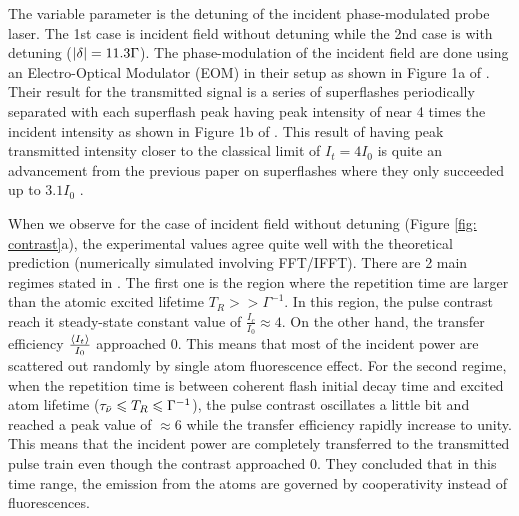 The variable parameter is the detuning of the incident phase-modulated probe laser. The 1st case is incident field without detuning while the 2nd case is with detuning ($\abs{\delta} = 11.3 \Gamma$). The phase-modulation of the incident field are done using an Electro-Optical Modulator (EOM) in their setup as shown in Figure 1a of \cite{Kwong2015}. Their result for the transmitted signal is a series of superflashes periodically separated with each superflash peak having peak intensity of near 4 times the incident intensity as shown in Figure 1b of \cite{Kwong2015}. This result of having peak transmitted intensity closer to the classical limit of $I_{t} = 4 I_{0}$ is quite an advancement from the previous paper on superflashes where they only succeeded up to $3.1 I_{0}$ \cite{Kwong2014}.

When we observe for the case of incident field without detuning (Figure \ref{fig: contrast}a), the experimental values agree quite well with the theoretical prediction \cite{Kwong2015} (numerically simulated involving FFT/IFFT). There are 2 main regimes stated in \cite{Kwong2015}. The first one is the region where the repetition time are larger than the atomic excited lifetime $T_{R} >> \Gamma^{-1}$. In this region, the pulse contrast reach it steady-state constant value of $\frac{I_{c}}{I_{0}} \approx 4$. On the other hand, the transfer efficiency $\frac{\expval{I_{t}}}{I_{0}}$ approached 0. This means that most of the incident power are scattered out randomly by single atom fluorescence effect. For the second regime, when the repetition time is between coherent flash initial decay time and excited atom lifetime ($\tau_{\Bar{\nu}} \leqslant T_{R} \leqslant \Gamma^{-1}$), the pulse contrast oscillates a little bit and reached a peak value of $\approx 6$ while the transfer efficiency rapidly increase to unity. This means that the incident power are completely transferred to the transmitted pulse train even though the contrast approached 0. They concluded that in this time range, the emission from the atoms are governed by cooperativity instead of fluorescences.

